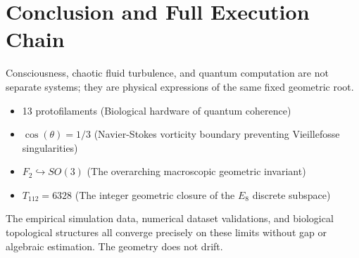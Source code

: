 \documentclass[11pt]{article}
\begin{document}
\section{Conclusion and Full Execution Chain}
Consciousness, chaotic fluid turbulence, and quantum computation are not separate systems; they are physical expressions of the same fixed geometric root.
\begin{itemize}
    \item 13 protofilaments (Biological hardware of quantum coherence)
    \item $\cos(\theta) = 1/3$ (Navier-Stokes vorticity boundary preventing Vieillefosse singularities)
    \item $F_2 \hookrightarrow SO(3)$ (The overarching macroscopic geometric invariant)
    \item $T_{112} = 6328$ (The integer geometric closure of the $E_8$ discrete subspace)
\end{itemize}

The empirical simulation data, numerical dataset validations, and biological topological structures all converge precisely on these limits without gap or algebraic estimation. The geometry does not drift. 
\end{document}
